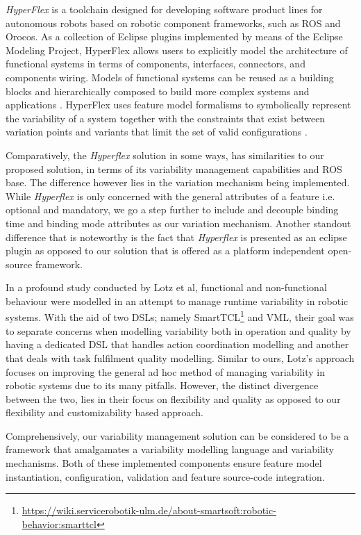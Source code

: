 \documentclass[conference]{IEEEtran}
\newcommand{\foot}[1]{\footnote{\url{#1}}}
\begin{document}
\textit{HyperFlex} is a toolchain designed for developing software product lines for autonomous robots based on robotic component frameworks, such as ROS and Orocos.
As a collection of Eclipse plugins implemented by means of the Eclipse Modeling Project, HyperFlex allows users to explicitly model the architecture of functional systems in terms of components, interfaces, connectors, and components wiring. Models of functional systems can be reused as a building blocks and hierarchically composed to build more complex systems and applications \cite{ros-ref}. HyperFlex uses feature model formalisms to symbolically represent the variability of a system together with the constraints that exist between variation points and variants that limit the set of valid configurations \cite{ros-ref}.

Comparatively, the \textit{Hyperflex} solution in some ways, has similarities to our proposed solution, in terms of its variability management capabilities and ROS base. The difference however lies in the variation mechanism being implemented. While \textit{Hyperflex} is only concerned with the general attributes of a feature i.e. optional and mandatory, we go a step further to include and decouple binding time and binding mode attributes as our variation mechanism. Another standout difference that is noteworthy is the fact that \textit{Hyperflex} is presented as an eclipse plugin as opposed to our solution that is offered as a platform independent open-source framework.

In a profound study conducted by Lotz et al\cite{man-runt-var-lotz}, functional and non-functional behaviour were modelled in an attempt to manage runtime variability in robotic systems. With the aid of two DSLs; namely SmartTCL\foot{https://wiki.servicerobotik-ulm.de/about-smartsoft:robotic-behavior:smarttcl} and VML\cite{vml}, their goal was to separate concerns when modelling variability both in operation and quality by having a dedicated DSL that handles action coordination modelling and another that deals with task fulfilment quality modelling. Similar to ours, Lotz's approach focuses on improving the general ad hoc method of managing variability in robotic systems due to its many pitfalls. However, the distinct divergence between the two, lies in their focus on flexibility and quality as opposed to our flexibility and customizability based approach.

Comprehensively, our variability management solution can be considered to be a framework that amalgamates a variability modelling language and variability mechanisms. Both of these implemented components ensure feature model instantiation, configuration, validation and feature source-code integration.
\end{document}
